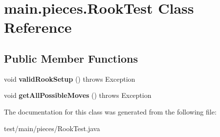 \hypertarget{classmain_1_1pieces_1_1_rook_test}{}\section{main.\+pieces.\+Rook\+Test Class Reference}
\label{classmain_1_1pieces_1_1_rook_test}
\subsection*{Public Member Functions}
\begin{DoxyCompactItemize}
\item 
\mbox{\label{classmain_1_1pieces_1_1_rook_test_a3e311477a89bfcd856f4f8240fd10b9c}} 
void {\bfseries valid\+Rook\+Setup} ()  throws Exception 
\item 
\mbox{\label{classmain_1_1pieces_1_1_rook_test_acd018a1cc149e95e3d9a3228d7a11f29}} 
void {\bfseries get\+All\+Possible\+Moves} ()  throws Exception 
\end{DoxyCompactItemize}


The documentation for this class was generated from the following file\+:\begin{DoxyCompactItemize}
\item 
test/main/pieces/Rook\+Test.\+java\end{DoxyCompactItemize}
